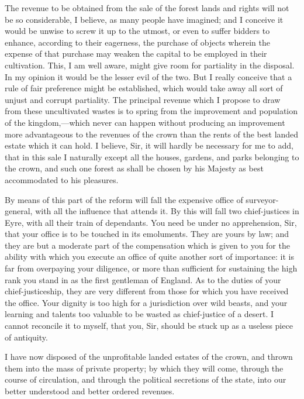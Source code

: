 The revenue to be obtained from the sale of the forest lands and rights will not be so considerable, I believe, as many people have imagined; and I conceive it would be unwise to screw it up to the utmost, or even to suffer bidders to enhance, according to their eagerness, the purchase of objects wherein the expense of that purchase may weaken the capital to be employed in their cultivation. This, I am well aware, might give room for partiality in the disposal. In my opinion it would be the lesser evil of the two. But I really conceive that a rule of fair preference might be established, which would take away all sort of unjust and corrupt partiality. The principal revenue which I propose to draw from these uncultivated wastes is to spring from the improvement and population of the kingdom,—which never can happen without producing an improvement more advantageous to the revenues of the crown than the rents of the best landed estate which it can hold. I believe, Sir, it will hardly be necessary for me to add, that in this sale I naturally except all the houses, gardens, and parks belonging to the crown, and such one forest as shall be chosen by his Majesty as best accommodated to his pleasures.

By means of this part of the reform will fall the expensive office of surveyor-general, with all the influence that attends it. By this will fall two chief-justices in Eyre, with all their train of dependants. You need be under no apprehension, Sir, that your office is to be touched in its emoluments. They are yours by law; and they are but a moderate part of the compensation which is given to you for the ability with which you execute an office of quite another sort of importance: it is far from overpaying your diligence, or more than sufficient for sustaining the high rank you stand in as the first gentleman of England. As to the duties of your chief-justiceship, they are very different from those for which you have received the office. Your dignity is too high for a jurisdiction over wild beasts, and your learning and talents too valuable to be wasted as chief-justice of a desert. I cannot reconcile it to myself, that you, Sir, should be stuck up as a useless piece of antiquity.

I have now disposed of the unprofitable landed estates of the crown, and thrown them into the mass of private property; by which they will come, through the course of circulation, and through the political secretions of the state, into our better understood and better ordered revenues.

